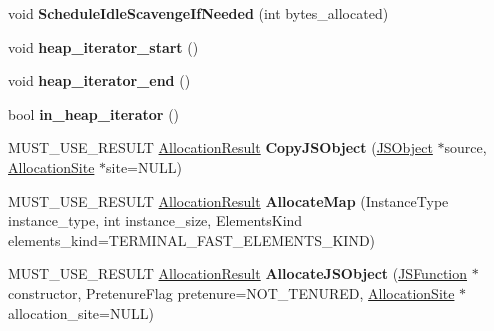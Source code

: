 \begin{DoxyCompactItemize}
\item 
void {\bfseries Schedule\+Idle\+Scavenge\+If\+Needed} (int bytes\+\_\+allocated)\hypertarget{classv8_1_1internal_1_1_heap_a13cda7707fc1615065751f531c4d9b06}{}\label{classv8_1_1internal_1_1_heap_a13cda7707fc1615065751f531c4d9b06}

\item 
void {\bfseries heap\+\_\+iterator\+\_\+start} ()\hypertarget{classv8_1_1internal_1_1_heap_abc92280ee668f6f3eb421eb59379ce00}{}\label{classv8_1_1internal_1_1_heap_abc92280ee668f6f3eb421eb59379ce00}

\item 
void {\bfseries heap\+\_\+iterator\+\_\+end} ()\hypertarget{classv8_1_1internal_1_1_heap_a65c2e5917f3c235287c3657f46637829}{}\label{classv8_1_1internal_1_1_heap_a65c2e5917f3c235287c3657f46637829}

\item 
bool {\bfseries in\+\_\+heap\+\_\+iterator} ()\hypertarget{classv8_1_1internal_1_1_heap_a4036f3713159d20fbd67edc5bb62eb6f}{}\label{classv8_1_1internal_1_1_heap_a4036f3713159d20fbd67edc5bb62eb6f}

\item 
M\+U\+S\+T\+\_\+\+U\+S\+E\+\_\+\+R\+E\+S\+U\+LT \hyperlink{classv8_1_1internal_1_1_allocation_result}{Allocation\+Result} {\bfseries Copy\+J\+S\+Object} (\hyperlink{classv8_1_1internal_1_1_j_s_object}{J\+S\+Object} $\ast$source, \hyperlink{classv8_1_1internal_1_1_allocation_site}{Allocation\+Site} $\ast$site=N\+U\+LL)\hypertarget{classv8_1_1internal_1_1_heap_a02c2ff0e3631bcab476a0ead64c4d9c0}{}\label{classv8_1_1internal_1_1_heap_a02c2ff0e3631bcab476a0ead64c4d9c0}

\item 
M\+U\+S\+T\+\_\+\+U\+S\+E\+\_\+\+R\+E\+S\+U\+LT \hyperlink{classv8_1_1internal_1_1_allocation_result}{Allocation\+Result} {\bfseries Allocate\+Map} (Instance\+Type instance\+\_\+type, int instance\+\_\+size, Elements\+Kind elements\+\_\+kind=T\+E\+R\+M\+I\+N\+A\+L\+\_\+\+F\+A\+S\+T\+\_\+\+E\+L\+E\+M\+E\+N\+T\+S\+\_\+\+K\+I\+ND)\hypertarget{classv8_1_1internal_1_1_heap_a89390ce3c97f26bbbfb270e6189105f2}{}\label{classv8_1_1internal_1_1_heap_a89390ce3c97f26bbbfb270e6189105f2}

\item 
M\+U\+S\+T\+\_\+\+U\+S\+E\+\_\+\+R\+E\+S\+U\+LT \hyperlink{classv8_1_1internal_1_1_allocation_result}{Allocation\+Result} {\bfseries Allocate\+J\+S\+Object} (\hyperlink{classv8_1_1internal_1_1_j_s_function}{J\+S\+Function} $\ast$constructor, Pretenure\+Flag pretenure=N\+O\+T\+\_\+\+T\+E\+N\+U\+R\+ED, \hyperlink{classv8_1_1internal_1_1_allocation_site}{Allocation\+Site} $\ast$allocation\+\_\+site=N\+U\+LL)\hypertarget{classv8_1_1internal_1_1_heap_acc030ee6688ee973f9673e0387c4b600}{}\label{classv8_1_1internal_1_1_heap_acc030ee6688ee973f9673e0387c4b600}


\end{DoxyCompactItemize}
